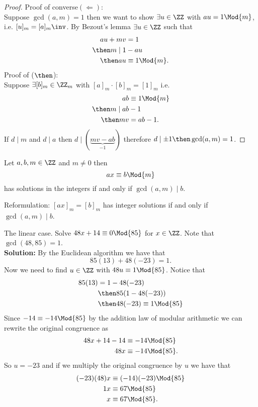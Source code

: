 \documentclass[12pt, a4paper]{article}
\begin{document}
\begin{proof}
    Proof of converse\((\Leftarrow)\): \\
    Suppose \(\gcd(a,m)=1\) then we want to show \(\exists u \in \ZZ\) with \(au=1 \Mod{m}\), i.e. \([u]_m=[a]_m\inv\). By Bezout's lemma \(\exists u \in \ZZ\) such that
    \[\begin{aligned}
        au+mv &=1 \\
        \then m \mid  1&-au \\
        \then au &\equiv 1 \Mod{m}.
    \end{aligned}\]
    Proof of (\(\then\)): \\
    Suppose \(\exists [b]_m \in \ZZ_m\) with \([a]_m \cdot [b]_m =[1]_m\) i.e.
    \[\begin{aligned}
        ab &\equiv 1 \Mod{m} \\
        \then m \mid ab&-1\\
        \then mv &= ab-1.
    \end{aligned}\]
    If \(d\mid m\) and \(d\mid a\) then \(d\mid (\underbrace{mv-ab}_{-1})\) therefore \(d\mid \pm 1 \then \gcd(a,m)=1\).
\end{proof}

\begin{mdprop}
    Let \(a,b,m \in \ZZ\) and \(m\neq 0\) then 
    \[ax \equiv b \Mod{m}\]
    has solutions in the integers if and only if \(\gcd(a,m) \mid b\).
\end{mdprop}

\begin{mdremark}
    Reformulation: \([ax]_m=[b]_m\) has integer solutions if and only if \(\gcd(a,m)\mid b\).
\end{mdremark}

\begin{example}
    The linear case. Solve \(48x+14 \equiv 0 \Mod{85}\) for \(x\in \ZZ\). Note that \(\gcd(48,85)=1\). \\
    \textbf{Solution:} By the Euclidean algorithm we have that 
    \[85(13)+48(-23)=1.\]
    Now we need to find \(u \in \ZZ\) with \(48u \equiv 1 \Mod{85}\). Notice that 
    \[\begin{aligned}
        85(13)& = 1 -48(-23) \\
        &\then 85  (1-48(-23)) \\ 
        &\then 48(-23) \equiv 1 \Mod{85}
    \end{aligned}\]
    Since \(-14 \equiv -14 \Mod{85}\) by the addition law of modular arithmetic we can rewrite the original congruence as
    \[\begin{aligned}
        48x+14 -14 &\equiv -14 \Mod{85} \\
        48x &\equiv -14 \Mod{85}.
    \end{aligned}\]
    So \(u=-23\) and if we multiply the original congruence by \(u\) we have that 
    \[\begin{aligned}
        (-23)(48)x &\equiv (-14)(-23) \Mod{85} \\
        1x &\equiv 67 \Mod{85} \\
        x &\equiv 67 \Mod{85}.
    \end{aligned}\]
\end{example}
\end{document}
